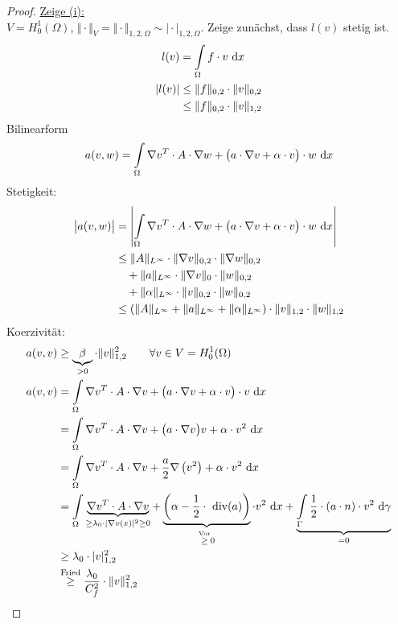 \begin{proof}
\underline{Zeige (i):}\\
$V=H_0^1(\Omega)$, $\Vert\cdot\Vert_V=\Vert\cdot\Vert_{1,2,\Omega}\sim\vert\cdot\vert_{1,2,\Omega}$. 
Zeige zunächst, dass $l(v)$ stetig ist. %
\begin{align*}
l(v)&=\int\limits_\Omega f\cdot v\text{ d} x\\
|l(v)|&\leq\Vert f\Vert_{0,2}\cdot\Vert v\Vert_{0,2}\\
			&\leq\Vert f\Vert_{0,2}\cdot\Vert v\Vert_{1,2}
\end{align*}
Bilinearform
\begin{align*}
a(v,w)=\int\limits_\Omega\nabla v^T\cdot A\cdot\nabla w+\big(a\cdot\nabla v+\alpha\cdot v\big)\cdot w\text{ d} x
\end{align*}
Stetigkeit:
\begin{align*}
\big|a(v,w)\big|&=\left|\int\limits_\Omega\nabla v^T\cdot A\cdot\nabla w+\big(a\cdot\nabla v+\alpha\cdot v\big)\cdot w\text{ d} x\right|\\
&\leq
\Vert A\Vert_{L^\infty}\cdot\Vert\nabla v\Vert_{0,2}\cdot\Vert\nabla w\Vert_{0,2}\\
&\quad+\Vert a\Vert_{L^\infty} \cdot\Vert\nabla v\Vert_{0}\cdot\Vert w\Vert_{0,2}\\
&\quad+\Vert\alpha\Vert_{L^\infty}\cdot\Vert v\Vert_{0,2}\cdot\Vert w\Vert_{0,2}\\
&\leq
\left(\Vert A\Vert_{L^\infty}+\Vert a\Vert_{L^\infty}+\Vert\alpha\Vert_{L^\infty}\right)\cdot\Vert v\Vert_{1,2}\cdot\Vert w\Vert_{1,2}
\end{align*}
Koerzivität: 
\begin{align*}
a(v,v)&\geq\underbrace{\beta}_{>0}\cdot\Vert v\Vert^2_{1,2}\qquad\forall v\in V=H_0^1(\Omega)\\
a(v,v)&=
\int\limits_\Omega\nabla v^T\cdot A\cdot\nabla v+\big(a\cdot\nabla v+\alpha\cdot v\big)\cdot v\text{ d} x\\
&=\int\limits_\Omega\nabla v^T\cdot A\cdot\nabla v+\big(a\cdot\nabla v\big) v+\alpha\cdot v^2\text{ d} x\\
&=\int\limits_\Omega\nabla v^T\cdot A\cdot\nabla v+\frac{a}{2}\nabla \left(v^2\right)+\alpha\cdot v^2\text{ d} x\\
&=\int\limits_\Omega\underbrace{\nabla v^T\cdot A\cdot\nabla v}_{\geq\lambda_0\cdot|\nabla v(x)|^2\geq0}+\underbrace{\left(\alpha-\frac{1}{2}\cdot\text{ div}(a)\right)}_{\stackrel{\text{Vor}}{\geq}0}\cdot v^2\text{ d} x+\underbrace{\int\limits_{\Gamma}\frac{1}{2}\cdot(a\cdot n)\cdot v^2\text{ d}\gamma}_{=0}\\
&\geq
\lambda_0\cdot |v|^2_{1,2}\\
&\stackrel{\text{Fried}}{\geq}
\frac{\lambda_0}{C_f^2}\cdot\Vert v\Vert^2_{1,2}
\end{align*}


\end{proof}
